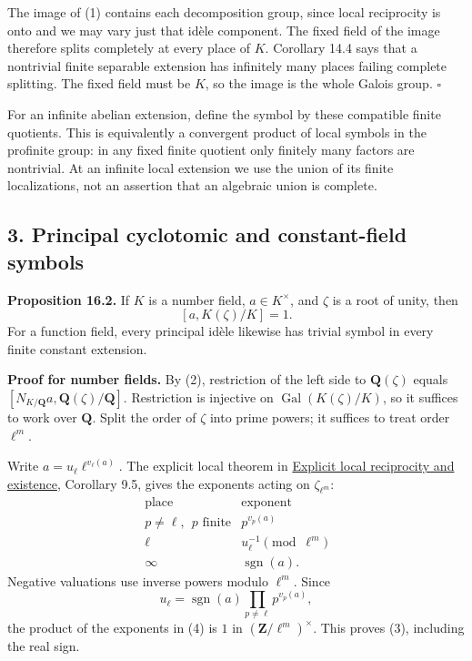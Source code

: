 \documentclass[11pt,a4paper]{article}
\begin{document}
The image of (1) contains each decomposition group, since local
reciprocity is onto and we may vary just that idèle component. The fixed
field of the image therefore splits completely at every place of \(K\).
Corollary 14.4 says that a nontrivial finite separable extension has
infinitely many places failing complete splitting. The fixed field must
be \(K\), so the image is the whole Galois group. \(\square\)

For an infinite abelian extension, define the symbol by these compatible
finite quotients. This is equivalently a convergent product of local
symbols in the profinite group: in any fixed finite quotient only
finitely many factors are nontrivial. At an infinite local extension we
use the union of its finite localizations, not an assertion that an
algebraic union is complete.

\subsection{3. Principal cyclotomic and constant-field
symbols}\label{principal-cyclotomic-and-constant-field-symbols}

\textbf{Proposition 16.2.} If \(K\) is a number field,
\(a\in K^\times\), and \(\zeta\) is a root of unity, then \[
[a,K(\zeta)/K]=1.
\tag{3}
\] For a function field, every principal idèle likewise has trivial
symbol in every finite constant extension.

\textbf{Proof for number fields.} By (2), restriction of the left side
to \(\mathbf Q(\zeta)\) equals
\([N_{K/\mathbf Q}a,\mathbf Q(\zeta)/\mathbf Q]\). Restriction is
injective on \(\operatorname{Gal}(K(\zeta)/K)\), so it suffices to work
over \(\mathbf Q\). Split the order of \(\zeta\) into prime powers; it
suffices to treat order \(\ell^m\).

Write \(a=u_\ell\ell^{v_\ell(a)}\). The explicit local theorem in
\href{../explicit-local-reciprocity-and-existence.html}{Explicit local
reciprocity and existence}, Corollary 9.5, gives the exponents acting on
\(\zeta_{\ell^m}\): \[
\begin{array}{c|c}
\text{place}&\text{exponent}\\ \hline
p\ne\ell,\ \ p\text{ finite}&p^{v_p(a)}\\
\ell&u_\ell^{-1}\pmod{\ell^m}\\
\infty&\operatorname{sgn}(a).
\end{array}
\tag{4}
\] Negative valuations use inverse powers modulo \(\ell^m\). Since \[
u_\ell=\operatorname{sgn}(a)\prod_{p\ne\ell}p^{v_p(a)},
\] the product of the exponents in (4) is \(1\) in
\((\mathbf Z/\ell^m)^\times\). This proves (3), including the real sign.
\end{document}
